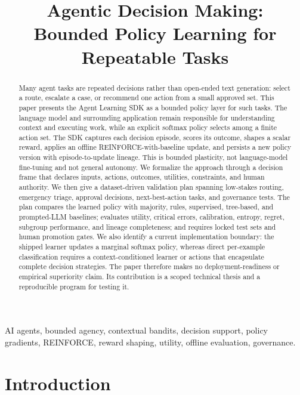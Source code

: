 \documentclass[conference]{IEEEtran}
\title{Agentic Decision Making:\\
Bounded Policy Learning for Repeatable Tasks}
\author{
\IEEEauthorblockN{Chris Tava}
\IEEEauthorblockA{Microsoft\\
christava@microsoft.com}}
\begin{document}
\maketitle

\begin{abstract}
Many agent tasks are repeated decisions rather than open-ended text
generation: select a route, escalate a case, or recommend one action from a small approved set.
This paper presents the Agent Learning SDK as a bounded policy layer for such tasks. The
language model and surrounding application remain responsible for
understanding context and executing work, while an explicit softmax
policy selects among a finite action set. The SDK captures each
decision episode, scores its outcome, shapes a scalar reward, applies
an offline REINFORCE-with-baseline update, and persists a new policy
version with episode-to-update lineage. This is bounded plasticity,
not language-model fine-tuning and not general autonomy. We formalize
the approach through a decision frame that declares inputs, actions,
outcomes, utilities, constraints, and human authority. We then give a
dataset-driven validation plan spanning low-stakes routing, emergency
triage, approval decisions, next-best-action tasks, and governance
tests. The plan compares the learned policy with majority, rules,
supervised, tree-based, and prompted-LLM baselines; evaluates utility,
critical errors, calibration, entropy, regret, subgroup performance,
and lineage completeness; and requires locked test sets and human
promotion gates. We also identify a current implementation boundary:
the shipped learner updates a marginal softmax policy, whereas direct
per-example classification requires a context-conditioned learner or
actions that encapsulate complete decision strategies. The paper
therefore makes no deployment-readiness or empirical superiority
claim. Its contribution is a scoped technical thesis and a
reproducible program for testing it.
\end{abstract}

\begin{IEEEkeywords}
AI agents, bounded agency, contextual bandits, decision support,
policy gradients, REINFORCE, reward shaping, utility, offline
evaluation, governance.
\end{IEEEkeywords}

\section{Introduction}
\label{sec:intro}
\end{document}
